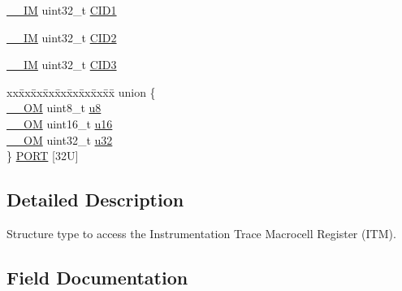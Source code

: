 \begin{DoxyCompactItemize}
\item 
\mbox{\hyperlink{core__cm4_8h_a4cc1649793116d7c2d8afce7a4ffce43}{\+\_\+\+\_\+\+IM}} uint32\+\_\+t \mbox{\hyperlink{struct_i_t_m___type_a4e60a608afd6433ecd943d95e417b80b}{C\+I\+D1}}
\item 
\mbox{\hyperlink{core__cm4_8h_a4cc1649793116d7c2d8afce7a4ffce43}{\+\_\+\+\_\+\+IM}} uint32\+\_\+t \mbox{\hyperlink{struct_i_t_m___type_ad98950702e55d1851e91b22de07b11aa}{C\+I\+D2}}
\item 
\mbox{\hyperlink{core__cm4_8h_a4cc1649793116d7c2d8afce7a4ffce43}{\+\_\+\+\_\+\+IM}} uint32\+\_\+t \mbox{\hyperlink{struct_i_t_m___type_ab9af64f413bf6f67e2a8044481292f67}{C\+I\+D3}}
\item 
\begin{tabbing}
xx\=xx\=xx\=xx\=xx\=xx\=xx\=xx\=xx\=\kill
union \{\\
\>\mbox{\hyperlink{core__cm4_8h_a0ea2009ed8fd9ef35b48708280fdb758}{\_\_OM}} uint8\_t \mbox{\hyperlink{struct_i_t_m___type_a4c0550e859d614c607bd4b575f05425c}{u8}}\\
\>\mbox{\hyperlink{core__cm4_8h_a0ea2009ed8fd9ef35b48708280fdb758}{\_\_OM}} uint16\_t \mbox{\hyperlink{struct_i_t_m___type_ae93660eefe2482a8564fae9a1ca39739}{u16}}\\
\>\mbox{\hyperlink{core__cm4_8h_a0ea2009ed8fd9ef35b48708280fdb758}{\_\_OM}} uint32\_t \mbox{\hyperlink{struct_i_t_m___type_ae89dd50f788f12863c681fba1a5b60d1}{u32}}\\
\} \mbox{\hyperlink{struct_i_t_m___type_a59dfe463f963fae339f3cbde7cb96821}{PORT}} \mbox{[}32U\mbox{]}\\

\end{tabbing}\end{DoxyCompactItemize}


\subsection{Detailed Description}
Structure type to access the Instrumentation Trace Macrocell Register (I\+TM). 

\subsection{Field Documentation}
\mbox{\label{struct_i_t_m___type_a26bbad5d9e0f1d302611d52373aef839}} 
